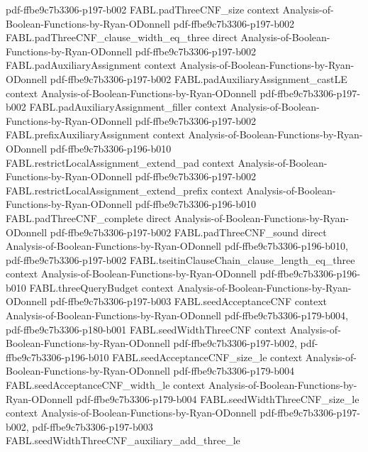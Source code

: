 \begin{theorem}
  {pdf-ffbe9c7b3306-p197-b002}
\proofstep
  {FABL.padThreeCNF_size}
  {context}
  {Analysis-of-Boolean-Functions-by-Ryan-ODonnell}
  {pdf-ffbe9c7b3306-p197-b002}
\proofstep
  {FABL.padThreeCNF_clause_width_eq_three}
  {direct}
  {Analysis-of-Boolean-Functions-by-Ryan-ODonnell}
  {pdf-ffbe9c7b3306-p197-b002}
\proofstep
  {FABL.padAuxiliaryAssignment}
  {context}
  {Analysis-of-Boolean-Functions-by-Ryan-ODonnell}
  {pdf-ffbe9c7b3306-p197-b002}
\proofstep
  {FABL.padAuxiliaryAssignment_castLE}
  {context}
  {Analysis-of-Boolean-Functions-by-Ryan-ODonnell}
  {pdf-ffbe9c7b3306-p197-b002}
\proofstep
  {FABL.padAuxiliaryAssignment_filler}
  {context}
  {Analysis-of-Boolean-Functions-by-Ryan-ODonnell}
  {pdf-ffbe9c7b3306-p197-b002}
\proofstep
  {FABL.prefixAuxiliaryAssignment}
  {context}
  {Analysis-of-Boolean-Functions-by-Ryan-ODonnell}
  {pdf-ffbe9c7b3306-p196-b010}
\proofstep
  {FABL.restrictLocalAssignment_extend_pad}
  {context}
  {Analysis-of-Boolean-Functions-by-Ryan-ODonnell}
  {pdf-ffbe9c7b3306-p197-b002}
\proofstep
  {FABL.restrictLocalAssignment_extend_prefix}
  {context}
  {Analysis-of-Boolean-Functions-by-Ryan-ODonnell}
  {pdf-ffbe9c7b3306-p196-b010}
\proofstep
  {FABL.padThreeCNF_complete}
  {direct}
  {Analysis-of-Boolean-Functions-by-Ryan-ODonnell}
  {pdf-ffbe9c7b3306-p197-b002}
\proofstep
  {FABL.padThreeCNF_sound}
  {direct}
  {Analysis-of-Boolean-Functions-by-Ryan-ODonnell}
  {pdf-ffbe9c7b3306-p196-b010,
    pdf-ffbe9c7b3306-p197-b002}
\proofstep
  {FABL.tseitinClauseChain_clause_length_eq_three}
  {context}
  {Analysis-of-Boolean-Functions-by-Ryan-ODonnell}
  {pdf-ffbe9c7b3306-p196-b010}
\proofstep
  {FABL.threeQueryBudget}
  {context}
  {Analysis-of-Boolean-Functions-by-Ryan-ODonnell}
  {pdf-ffbe9c7b3306-p197-b003}
\proofstep
  {FABL.seedAcceptanceCNF}
  {context}
  {Analysis-of-Boolean-Functions-by-Ryan-ODonnell}
  {pdf-ffbe9c7b3306-p179-b004,
    pdf-ffbe9c7b3306-p180-b001}
\proofstep
  {FABL.seedWidthThreeCNF}
  {context}
  {Analysis-of-Boolean-Functions-by-Ryan-ODonnell}
  {pdf-ffbe9c7b3306-p197-b002,
    pdf-ffbe9c7b3306-p196-b010}
\proofstep
  {FABL.seedAcceptanceCNF_size_le}
  {context}
  {Analysis-of-Boolean-Functions-by-Ryan-ODonnell}
  {pdf-ffbe9c7b3306-p179-b004}
\proofstep
  {FABL.seedAcceptanceCNF_width_le}
  {context}
  {Analysis-of-Boolean-Functions-by-Ryan-ODonnell}
  {pdf-ffbe9c7b3306-p179-b004}
\proofstep
  {FABL.seedWidthThreeCNF_size_le}
  {context}
  {Analysis-of-Boolean-Functions-by-Ryan-ODonnell}
  {pdf-ffbe9c7b3306-p197-b002,
    pdf-ffbe9c7b3306-p197-b003}
\proofstep
  {FABL.seedWidthThreeCNF_auxiliary_add_three_le}

\end{theorem}
